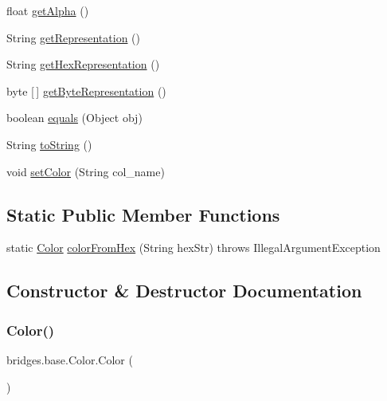 \begin{DoxyCompactItemize}
\item 
float \mbox{\hyperlink{classbridges_1_1base_1_1_color_a7c4247e31ecd8fcc61ef208d5deefe68}{get\+Alpha}} ()
\item 
String \mbox{\hyperlink{classbridges_1_1base_1_1_color_a2f9b0cb588e49b2ebf2f015d4d7507d0}{get\+Representation}} ()
\item 
String \mbox{\hyperlink{classbridges_1_1base_1_1_color_aced9bc89248b85686ba5385472974fe6}{get\+Hex\+Representation}} ()
\item 
byte \mbox{[}$\,$\mbox{]} \mbox{\hyperlink{classbridges_1_1base_1_1_color_a07215c888a6d17374a3d862ff30d5f93}{get\+Byte\+Representation}} ()
\item 
boolean \mbox{\hyperlink{classbridges_1_1base_1_1_color_a81fb4cb13c05a3da2f29f48b07189e7c}{equals}} (Object obj)
\item 
String \mbox{\hyperlink{classbridges_1_1base_1_1_color_a62e7406ca7d36ed755c28a86376328ba}{to\+String}} ()
\item 
void \mbox{\hyperlink{classbridges_1_1base_1_1_color_a54dcd31227bde0f5d0a4f5d3b5a24ed2}{set\+Color}} (String col\+\_\+name)
\end{DoxyCompactItemize}
\subsection*{Static Public Member Functions}
\begin{DoxyCompactItemize}
\item 
static \mbox{\hyperlink{classbridges_1_1base_1_1_color}{Color}} \mbox{\hyperlink{classbridges_1_1base_1_1_color_a94e599a1562275e7f04e337ba109b19c}{color\+From\+Hex}} (String hex\+Str)  throws Illegal\+Argument\+Exception 
\end{DoxyCompactItemize}


\subsection{Constructor \& Destructor Documentation}
\mbox{\label{classbridges_1_1base_1_1_color_ab6d71ac2ee1430fb2db2fbe34e692de8}} 
\subsubsection{\texorpdfstring{Color()}{Color()}\hspace{0.1cm}{\footnotesize\ttfamily [1/4]}}
{\footnotesize\ttfamily bridges.\+base.\+Color.\+Color (\begin{DoxyParamCaption}{ }\end{DoxyParamCaption})}

